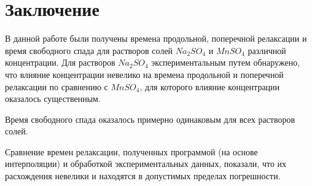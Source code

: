 \section{Заключение}
В данной работе были получены времена продольной, поперечной релаксации 
и время свободного спада
для растворов солей $Na_2 SO_4$ и $Mn SO_4$ различной концентрации. Для растворов $ Na_2 SO_4 $ экспериментальным путем обнаружено, что влияние концентрации невелико на времена продольной и поперечной релаксации по сравнению с $ Mn SO_4 $, для которого влияние концентрации оказалось существенным.

Время
свободного спада
оказалось примерно одинаковым для всех растворов солей.

Сравнение времен релаксации, полученных программой (на основе интерполяции) и обработкой экспериментальных данных, показали, что их расхождения невелики и находятся в допустимых пределах погрешности.

\printbibliography